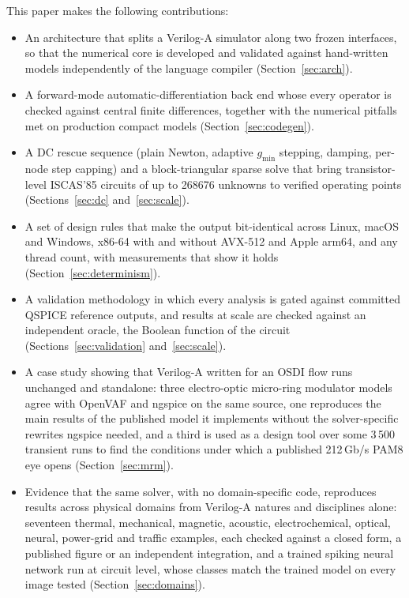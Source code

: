 This paper makes the following contributions:
\begin{itemize}
  \item An architecture that splits a Verilog-A simulator along two frozen interfaces, so that
  the numerical core is developed and validated against hand-written models independently of the
  language compiler (Section~\ref{sec:arch}).
  \item A forward-mode automatic-differentiation back end whose every operator is checked against
  central finite differences, together with the numerical pitfalls met on production compact
  models (Section~\ref{sec:codegen}).
  \item A DC rescue sequence (plain Newton, adaptive $g_\text{min}$ stepping, damping, per-node
  step capping) and a block-triangular sparse solve that bring transistor-level ISCAS'85
  circuits of up to \num{268676} unknowns to verified operating points (Sections~\ref{sec:dc}
  and~\ref{sec:scale}).
  \item A set of design rules that make the output bit-identical across Linux, macOS and Windows,
  x86-64 with and without AVX-512 and Apple arm64, and any thread count, with measurements that
  show it holds (Section~\ref{sec:determinism}).
  \item A validation methodology in which every analysis is gated against committed QSPICE
  reference outputs, and results at scale are checked against an independent oracle, the Boolean
  function of the circuit (Sections~\ref{sec:validation} and~\ref{sec:scale}).
  \item A case study showing that Verilog-A written for an OSDI flow runs unchanged and
  standalone: three electro-optic micro-ring modulator models agree with OpenVAF and ngspice on
  the same source, one reproduces the main results of the published model it implements without
  the solver-specific rewrites ngspice needed, and a third is used as a design tool over some
  3\,500 transient runs to find the conditions under which a published 212\,Gb/s PAM8 eye opens
  (Section~\ref{sec:mrm}).
  \item Evidence that the same solver, with no domain-specific code, reproduces results across
  physical domains from Verilog-A natures and disciplines alone: seventeen thermal, mechanical,
  magnetic, acoustic, electrochemical, optical, neural, power-grid and traffic examples, each
  checked against a closed form, a published figure or an independent integration, and a trained
  spiking neural network run at circuit level, whose classes match the trained model on every
  image tested (Section~\ref{sec:domains}).
\end{itemize}

